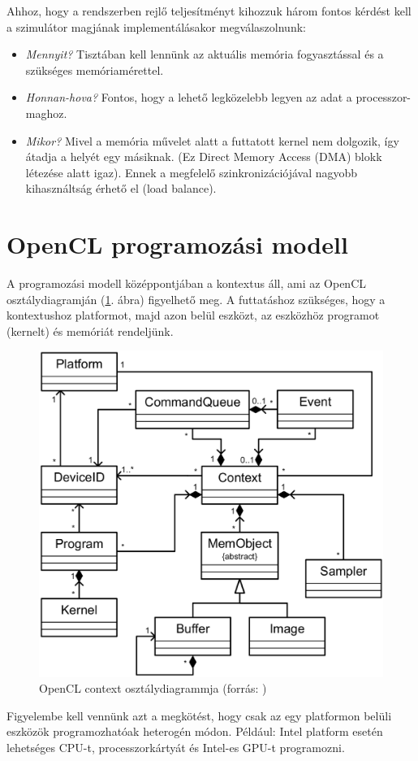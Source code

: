 	Ahhoz, hogy a rendszerben rejlő teljesítményt kihozzuk három fontos kérdést
	kell a szimulátor magjának implementálásakor megválaszolnunk:
	\begin{itemize}
		\item \emph{Mennyit?} Tisztában kell lennünk az aktuális
		memória fogyasztással és a szükséges memóriamérettel.
		\item \emph{Honnan-hova?} Fontos, hogy a lehető legközelebb legyen az adat
		a processzor-maghoz.
		\item \emph{Mikor?} Mivel a memória művelet alatt a futtatott kernel nem
		dolgozik, így átadja a helyét egy másiknak. (Ez Direct Memory Access (DMA)
		blokk létezése alatt igaz). Ennek a megfelelő szinkronizációjával nagyobb
		kihasználtság érhető el (load balance).
	\end{itemize}
	
	
\section{OpenCL programozási modell}
	
	A programozási modell középpontjában a kontextus áll, ami az OpenCL
	osztálydiagramján (\ref{fig:class}. ábra) figyelhető meg.
	A futtatáshoz szükséges, hogy a kontextushoz platformot, majd azon belül
	eszközt, az eszközhöz programot (kernelt) és memóriát rendeljünk.
	\begin{figure}[!ht]
		\centering
		\includegraphics[width=0.6\columnwidth]{figures/eps/context.eps}
		\caption[OpenCL context osztálydiagrammja]{OpenCL context osztálydiagrammja (forrás: \cite{opencl})} 
		\label{fig:class} 
	\end{figure}
	Figyelembe kell vennünk azt a megkötést, hogy csak az egy platformon belüli
	eszközök programozhatóak heterogén módon. Például: Intel platform esetén
	lehetséges CPU-t, processzorkártyát és Intel-es GPU-t programozni.
	
